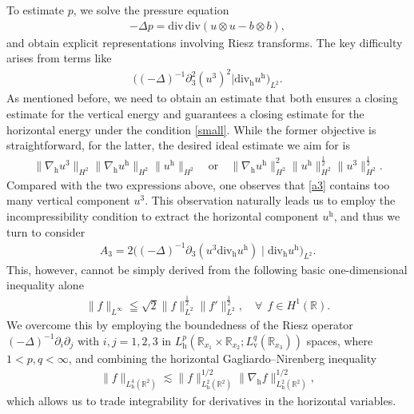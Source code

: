 \documentclass[11pt]{amsart}
\theoremstyle{definition}
\newcommand{\R}{\mathbb{R}}
\newcommand{\h}{\mathrm{h}}
\newcommand{\nablah}{\nabla_{\mathrm{h}}}
\numberwithin{equation}{section}
\begin{document}
To estimate $p$, we solve the pressure equation
\begin{align}\label{ppp}
	-\Delta p = \mathrm{div}\,\mathrm{div}(u\otimes u - b\otimes b),
\end{align}
and obtain explicit representations involving Riesz transforms. The key difficulty arises from terms like
\begin{align}\label{a3}
	\big((-\Delta)^{-1}\partial_3^2(u^3)^2 | \mathrm{div}_\mathrm{h} u^\mathrm{h}\big)_{L^2}.
\end{align}
As mentioned before, we need to obtain an estimate that both ensures a closing estimate for the vertical energy and guarantees a closing estimate for the horizontal energy under the condition \eqref{small}. While the former objective is straightforward, for the latter, the desired ideal estimate we aim for is
\begin{align*}
	\|\nablah u^3\|_{H^2}\|\nablah u^\h\|_{H^2}\|u^\h\|_{H^2} \quad\mathrm{or}\quad \|\nablah u^\h\|_{H^2}^2\|u^\h\|_{H^2}^\frac12\|u^3\|_{H^2}^\frac12.
\end{align*}
Compared with the two expressions above, one observes that \eqref{a3} contains too many vertical component $u^3$. This observation naturally leads us to employ the incompressibility condition to extract the horizontal component $u^\h$, and thus we turn to consider
\begin{align*}
	A_3 = 2\big((-\Delta)^{-1}\partial_3(u^3 \mathrm{div}_\mathrm{h} u^\mathrm{h}) \mid \mathrm{div}_\mathrm{h} u^\mathrm{h}\big)_{L^2}.
\end{align*}
This, however, cannot be simply derived from the following basic one-dimensional inequality alone
\begin{align}\label{L^infty_1D}
	\|f\|_{L^\infty}\leqq \sqrt{2}\|f\|_{L^2}^\frac12\|f'\|_{L^2}^\frac12, \quad\forall\ \  f\in H^1(\mathbb{R}).
\end{align}
We overcome this by employing the boundedness of the Riesz operator $(-\Delta)^{-1}\partial_i\partial_j$ with $i,j=1,2,3$ in $L_\text{h}^p(\R_{x_1}\times\R_{x_2};L_\text{v}^q(\R_{x_3}))$ spaces, where $1<p,q<\infty$, and combining the horizontal Gagliardo--Nirenberg inequality
\begin{align}\label{GNS2d}
	\|f\|_{L^4_\mathrm{h}(\mathbb{R}^2)} \lesssim \|f\|_{L^2_\mathrm{h}(\mathbb{R}^2)}^{1/2}\|\nabla_\mathrm{h} f\|_{L^2_\mathrm{h}(\mathbb{R}^2)}^{1/2},
\end{align}
which allows us to trade integrability for derivatives in the horizontal variables.
\end{document}
